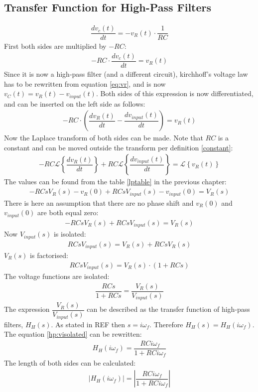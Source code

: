 \subsection{Transfer Function for High-Pass Filters}
\begin{align}
\dfrac{dv_{c}(t)}{dt} = -v_{R}(t) \cdot \dfrac{1}{RC}
\end{align}
First both sides are multiplied by $-RC$:
\begin{align}
-RC \cdot \dfrac{dv_{c}(t)}{dt} = v_{R}(t)
\end{align}
Since it is now a high-pass filter (and a different circuit), kirchhoff's voltage law has to be rewritten from equation \eqref{eq:vr}, and is now $v_{C}(t)=v_{R}(t)-v_{input}(t)$. Both sides of this expression is now differentiated, and can be inserted on the left side as follows:
\begin{align*}
-RC \cdot \left(\dfrac{dv_{R}(t)}{dt} - \dfrac{dv_{input}(t)}{dt} \right) = v_{R}(t)
\end{align*}
Now the Laplace transform of both sides can be made. Note that $RC$ is a constant and can be moved outside the transform per definition \ref{constant}:
\begin{align*}
-RC \mathcal{L} \left\{\dfrac{dv_{R}(t)}{dt} \right\} + RC \mathcal{L} \left\{ \dfrac{dv_{input}(t)}{dt} \right\} = \mathcal{L} \left\{v_{R}(t) \right\}
\end{align*}
The values can be found from the table \ref{lptable} in the previous chapter:
\begin{align*}
-RCsV_{R}(s)-v_{R}(0) + RCsV_{input}(s)-v_{input}(0) = V_{R}(s)
\end{align*}
There is here an assumption that there are no phase shift and $v_{R}(0)$ and $v_{input}(0)$ are both equal zero:
\begin{align*}
-RCsV_{R}(s) + RCsV_{input}(s) = V_{R}(s)
\end{align*}
Now $V_{input}(s)$ is isolated:
\begin{align*}
RCsV_{input}(s) = V_{R}(s) + RCsV_{R}(s)
\end{align*}
$V_{R}(s)$ is factorised:
\begin{align*}
RCsV_{input}(s) = V_{R}(s) \cdot (1 + RCs)
\end{align*}
The voltage functions are isolated:
\begin{align} \label{hp:visolated}
\dfrac{RCs}{1 + RCs} = \dfrac{V_{R}(s)}{V_{input}(s)}
\end{align}
The expression $\dfrac{V_{R}(s)}{V_{input}(s)}$ can be described as the transfer function of high-pass filters, $H_{H}(s)$. As stated in REF then $s=i \omega_f$. Therefore $H_{H}(s)=H_{H}(i \omega_f)$. The equation \eqref{hp:visolated} can be rewritten:
\begin{align*}
H_{H}(i \omega_f) = \dfrac{RCi \omega_f}{1 + RCi \omega_f}
\end{align*}
The length of both sides can be calculated:
\begin{align*}
\left|H_{H}(i \omega_f)\right| = \left|\dfrac{RCi \omega_f}{1 + RCi \omega_f} \right|
\end{align*}
